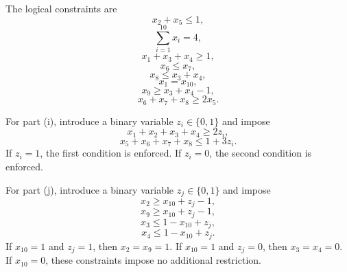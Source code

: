 \documentclass[11pt]{article}
\begin{document}
\begin{enumerate}
{The logical constraints are
\[
x_2+x_5\leq 1,
\]
\[
\sum_{i=1}^{10}x_i=4,
\]
\[
x_1+x_3+x_4\geq 1,
\]
\[
x_6\leq x_7,
\]
\[
x_8\leq x_3+x_4,
\]
\[
x_1=x_{10},
\]
\[
x_9\geq x_3+x_4-1,
\]
\[
x_6+x_7+x_8\geq 2x_5.
\]

For part (i), introduce a binary variable $z_i\in\{0,1\}$ and impose
\[
x_1+x_2+x_3+x_4\geq 2z_i,
\]
\[
x_5+x_6+x_7+x_8\leq 1+3z_i.
\]
If $z_i=1$, the first condition is enforced. If $z_i=0$, the second condition is enforced.

For part (j), introduce a binary variable $z_j\in\{0,1\}$ and impose
\[
x_2\geq x_{10}+z_j-1,
\]
\[
x_9\geq x_{10}+z_j-1,
\]
\[
x_3\leq 1-x_{10}+z_j,
\]
\[
x_4\leq 1-x_{10}+z_j.
\]
If $x_{10}=1$ and $z_j=1$, then $x_2=x_9=1$. If $x_{10}=1$ and $z_j=0$, then $x_3=x_4=0$. If $x_{10}=0$, these constraints impose no additional restriction.
}

\end{enumerate}
\end{document}
